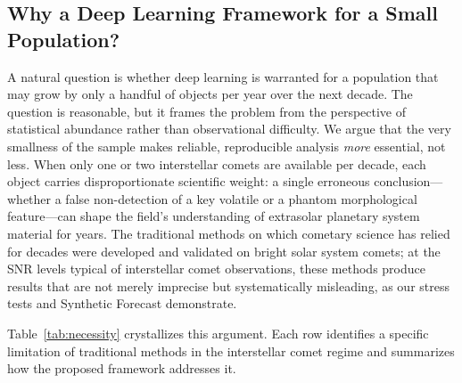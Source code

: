\documentclass[usenatbib]{mnras}
\begin{document}
\subsection{Why a Deep Learning Framework for a Small Population?}

A natural question is whether deep learning is warranted for a population that may grow by only a handful of objects per year over the next decade. The question is reasonable, but it frames the problem from the perspective of statistical abundance rather than observational difficulty. We argue that the very smallness of the sample makes reliable, reproducible analysis \textit{more} essential, not less. When only one or two interstellar comets are available per decade, each object carries disproportionate scientific weight: a single erroneous conclusion---whether a false non-detection of a key volatile or a phantom morphological feature---can shape the field's understanding of extrasolar planetary system material for years. The traditional methods on which cometary science has relied for decades were developed and validated on bright solar system comets; at the SNR levels typical of interstellar comet observations, these methods produce results that are not merely imprecise but systematically misleading, as our stress tests and Synthetic Forecast demonstrate.

Table~\ref{tab:necessity} crystallizes this argument. Each row identifies a specific limitation of traditional methods in the interstellar comet regime and summarizes how the proposed framework addresses it.
\end{document}
